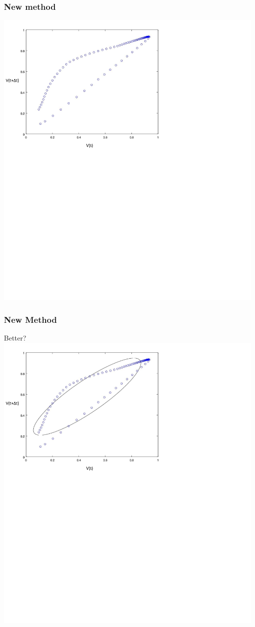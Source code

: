 \documentclass{beamer}
\begin{document}
	\begin{frame}
		\frametitle{New method}
		\includegraphics[scale=0.5]{adaptivesampling.jpg}
	\end{frame}
	
	\begin{frame}
		\frametitle{New Method}
		Better?
		\includegraphics[scale=0.45]{adaptiveellipse.jpg}
		
	\end{frame}
\end{document}
